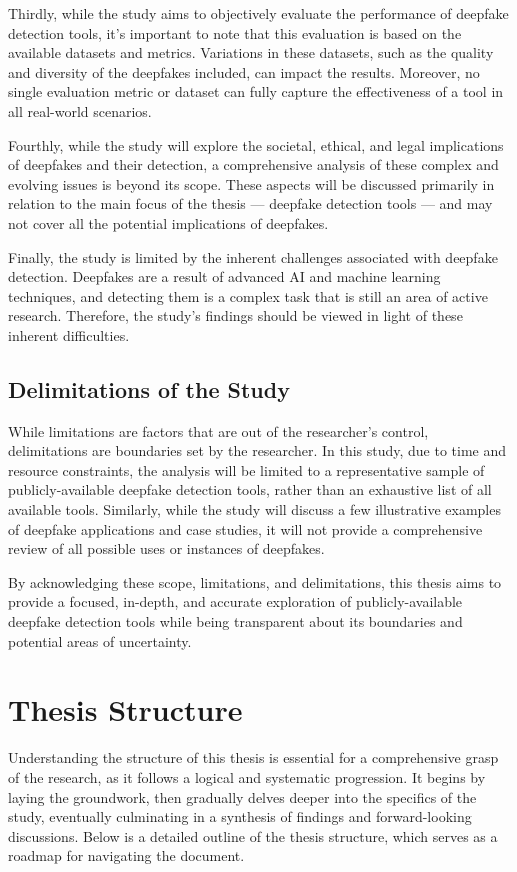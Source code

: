 Thirdly, while the study aims to objectively evaluate the performance of deepfake 
detection tools, it's important to note that this evaluation is based on the 
available datasets and metrics. Variations in these datasets, such as the quality 
and diversity of the deepfakes included, can impact the results. Moreover, no 
single evaluation metric or dataset can fully capture the effectiveness of a tool 
in all real-world scenarios.

Fourthly, while the study will explore the societal, ethical, and legal implications 
of deepfakes and their detection, a comprehensive analysis of these complex and 
evolving issues is beyond its scope. These aspects will be discussed primarily in 
relation to the main focus of the thesis --- deepfake detection tools --- and may not 
cover all the potential implications of deepfakes.

Finally, the study is limited by the inherent challenges associated with deepfake 
detection. Deepfakes are a result of advanced \ac{AI} and machine learning techniques, 
and detecting them is a complex task that is still an area of active research. 
Therefore, the study's findings should be viewed in light of these inherent difficulties.

\subsection{Delimitations of the Study}
While limitations are factors that are out of the researcher's control, delimitations 
are boundaries set by the researcher. In this study, due to time and resource constraints, 
the analysis will be limited to a representative sample of publicly-available deepfake 
detection tools, rather than an exhaustive list of all available tools. Similarly, while 
the study will discuss a few illustrative examples of deepfake applications and case 
studies, it will not provide a comprehensive review of all possible uses or instances 
of deepfakes.

By acknowledging these scope, limitations, and delimitations, this thesis aims to 
provide a focused, in-depth, and accurate exploration of publicly-available deepfake 
detection tools while being transparent about its boundaries and potential areas of 
uncertainty.

\section{Thesis Structure}\label{chapter:structure}
Understanding the structure of this thesis is essential for a comprehensive grasp of the 
research, as it follows a logical and systematic progression. It begins by laying the 
groundwork, then gradually delves deeper into the specifics of the study, eventually 
culminating in a synthesis of findings and forward-looking discussions. Below is a 
detailed outline of the thesis structure, which serves as a roadmap for navigating 
the document.

